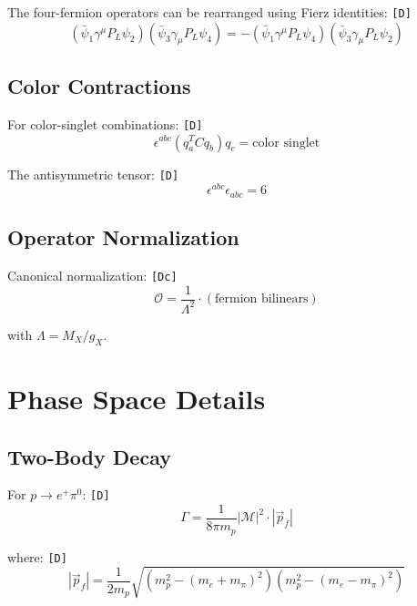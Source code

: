 \documentclass[11pt,a4paper]{article}
\newcommand{\tagD}{\textcolor{green!50!black}{\texttt{[D]}}}
\newcommand{\tagDc}{\textcolor{blue!70!black}{\texttt{[Dc]}}}
\theoremstyle{definition}
\begin{document}
The four-fermion operators can be rearranged using Fierz identities: \tagD{}
\begin{equation}
\label{eq:fierz-identity}
(\bar{\psi}_1 \gamma^\mu P_L \psi_2)(\bar{\psi}_3 \gamma_\mu P_L \psi_4) =
-(\bar{\psi}_1 \gamma^\mu P_L \psi_4)(\bar{\psi}_3 \gamma_\mu P_L \psi_2)
\end{equation}

\subsection{Color Contractions}
\label{app:color}

For color-singlet combinations: \tagD{}
\begin{equation}
\label{eq:color-singlet}
\epsilon^{abc} (q_a^T C q_b) q_c = \text{color singlet}
\end{equation}

The antisymmetric tensor: \tagD{}
\begin{equation}
\label{eq:epsilon-property}
\epsilon^{abc} \epsilon_{abc} = 6
\end{equation}

\subsection{Operator Normalization}
\label{app:normalization}

Canonical normalization: \tagDc{}
\begin{equation}
\label{eq:operator-norm}
\mathcal{O} = \frac{1}{\Lambda^2} \cdot (\text{fermion bilinears})
\end{equation}

with $\Lambda = M_X / g_X$.

\section{Phase Space Details}
\label{app:phase-space}

\subsection{Two-Body Decay}
\label{app:two-body}

For $p \to e^+ \pi^0$: \tagD{}
\begin{equation}
\label{eq:two-body-rate}
\Gamma = \frac{1}{8\pi m_p} |\mathcal{M}|^2 \cdot |\vec{p}_f|
\end{equation}

where: \tagD{}
\begin{equation}
\label{eq:final-momentum}
|\vec{p}_f| = \frac{1}{2m_p} \sqrt{(m_p^2 - (m_e + m_\pi)^2)(m_p^2 - (m_e - m_\pi)^2)}
\end{equation}
\end{document}
